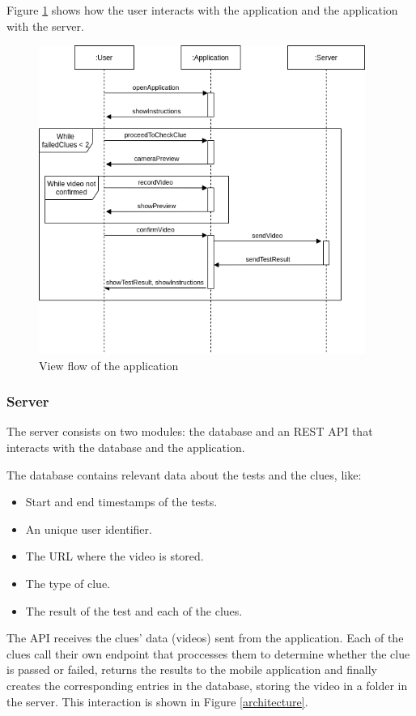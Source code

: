 Figure \ref{flowchart} shows how the user interacts with the application and the application with the server.

\begin{figure}[H]
    \centering
    \includegraphics[width=0.95\textwidth]{./img/flowchart.png}
    \caption{View flow of the application}
    \label{flowchart}
\end{figure}

\subsubsection{Server}

The server consists on two modules: the database and an REST API that interacts with the database and the application.

The database contains relevant data about the tests and the clues, like:

\begin{itemize}
  \item Start and end timestamps of the tests.
  \item An unique user identifier.
  \item The URL where the video is stored.
  \item The type of clue.
  \item The result of the test and each of the clues.
\end{itemize}

The API receives the clues' data (videos) sent from the application. Each of the clues call their own endpoint that proccesses them to determine whether the clue is passed or failed, returns the results to the mobile application and finally creates the corresponding entries in the database, storing the video in a folder in the server. This interaction is shown in Figure \ref{architecture}.
